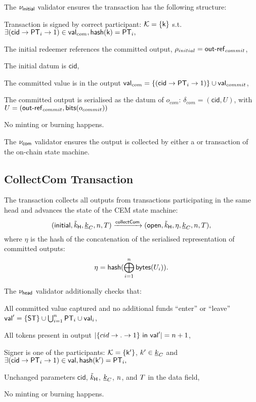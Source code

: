 \noindent The $\nu_\mathsf{initial}$ validator ensures the transaction has the following structure:
\begin{menumerate}
    \item Transaction is signed by correct participant: $\mathcal K = \{\mathsf{k}\}$ s.t.
    $
    \exists (\mathsf{cid} \rightarrow \mathsf{PT}_i \rightarrow 1) \in \mathsf{val}_{com}, \mathsf{hash}(\mathsf{k}) = \mathsf{PT}_i,
    $ 
    \item The initial redeemer references the committed output, $\rho_{initial} = \mathsf{out\textsf{-}{}ref}_{commit}$,
    \item The initial datum is $\mathsf{cid}$,
    \item The committed value is in the output $\mathsf{val}_{com} = \{(\mathsf{cid} \rightarrow \mathsf{PT}_i \rightarrow 1)\} \cup \mathsf{val}_{commit} $,
    \item The committed output is serialised as the datum of $o_{com}$: $\delta_{com} = (\mathsf{cid}, U)$, with \\ $U = (\mathsf{out\textsf{-}{}ref}_{commit},\mathsf{bits}(o_{commit}))$
    \item No minting or burning happens.
\end{menumerate}

\noindent The $\nu_\mathsf{com}$ validator ensures the output is collected by either a \mtxCCom{} or \mtxAbort{} transaction of the on-chain state machine.

\subsection{CollectCom Transaction}



The \mtxCCom{} transaction collects all outputs from \mtxCom{} transactions participating in the same head and advances the state of the CEM state machine:
$$
   (\mathsf{initial},\tilde{k}_{\mathsf{H}},\underline{k}_C,n,T) \xrightarrow{\mathsf{collectCom}} (\mathsf{open},\tilde{k}_{\mathsf{H}},\eta,\underline{k}_C,n,T),
$$
where $\eta$ is the hash of the concatenation of the serialised representation of committed outputs:
$$
\eta = \mathsf{hash}(\bigoplus_{i=1}^n \mathsf{bytes}(U_i)).
$$

\noindent The $\nu_\mathsf{head}$ validator additionally checks that:
\begin{menumerate}
  \item All committed value captured and no additional funds ``enter'' or ``leave''
  $\mathsf{val}' = \{\mathsf{ST}\} \cup \bigcup_{i=1}^{n} \mathsf{PT}_{i} \cup \mathsf{val}_{i}$,
  \item All tokens present in output
  $|\{cid \rightarrow . \rightarrow 1\} ~ \mathsf{in} ~ \mathsf{val}'| = n + 1$,
  \item Signer is one of the participants: $\mathcal K = \{\mathsf{k'}\}$, $k' \in \underline{k}_C$ and
    $
    \exists (\mathsf{cid} \rightarrow \mathsf{PT}_i \rightarrow 1) \in \mathsf{val}, \mathsf{hash}(\mathsf{k'}) = \mathsf{PT}_i,
    $
  \item Unchanged parameters $\mathsf{cid}$, $\tilde{k}_{\mathsf{H}}$, $\underline{k}_C$, $n$, and
  $T$ in the data field,
  \item No minting or burning happens.
\end{menumerate}

